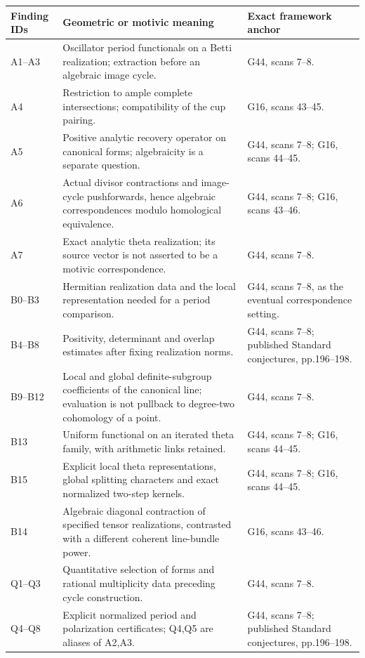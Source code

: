 \documentclass[11pt]{article}
\theoremstyle{definition}\newtheorem{definition}[theorem]{Definition}\newtheorem{remark}[theorem]{Remark}
\begin{document}
\begin{longtable}{@{}p{.18\linewidth}p{.48\linewidth}p{.27\linewidth}@{}}
\toprule Finding IDs & Geometric or motivic meaning & Exact framework anchor\\\midrule\endhead
A1--A3 & Oscillator period functionals on a Betti realization; extraction before an algebraic image cycle. & G44, scans 7--8.\\
A4 & Restriction to ample complete intersections; compatibility of the cup pairing. & G16, scans 43--45.\\
A5 & Positive analytic recovery operator on canonical forms; algebraicity is a separate question. & G44, scans 7--8; G16, scans 44--45.\\
A6 & Actual divisor contractions and image-cycle pushforwards, hence algebraic correspondences modulo homological equivalence. & G44, scans 7--8; G16, scans 43--46.\\
A7 & Exact analytic theta realization; its source vector is not asserted to be a motivic correspondence. & G44, scans 7--8.\\
B0--B3 & Hermitian realization data and the local representation needed for a period comparison. & G44, scans 7--8, as the eventual correspondence setting.\\
B4--B8 & Positivity, determinant and overlap estimates after fixing realization norms. & G44, scans 7--8; published Standard conjectures, pp.196--198.\\
B9--B12 & Local and global definite-subgroup coefficients of the canonical line; evaluation is not pullback to degree-two cohomology of a point. & G44, scans 7--8.\\
B13 & Uniform functional on an iterated theta family, with arithmetic links retained. & G44, scans 7--8; G16, scans 44--45.\\
B15 & Explicit local theta representations, global splitting characters and exact normalized two-step kernels. & G44, scans 7--8; G16, scans 44--45.\\
B14 & Algebraic diagonal contraction of specified tensor realizations, contrasted with a different coherent line-bundle power. & G16, scans 43--46.\\
Q1--Q3 & Quantitative selection of forms and rational multiplicity data preceding cycle construction. & G44, scans 7--8.\\
Q4--Q8 & Explicit normalized period and polarization certificates; Q4,Q5 are aliases of A2,A3. & G44, scans 7--8; published Standard conjectures, pp.196--198.\\

\end{longtable}
\end{document}
